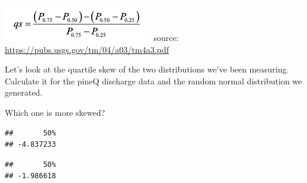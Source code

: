 \documentclass[
]{book}
\newenvironment{Shaded}{\begin{snugshade}}{\end{snugshade}}
\newcommand{\DecValTok}[1]{\textcolor[rgb]{0.00,0.00,0.81}{#1}}
\newcommand{\FunctionTok}[1]{\textcolor[rgb]{0.00,0.00,0.00}{#1}}
\newcommand{\NormalTok}[1]{#1}
\newcommand{\OtherTok}[1]{\textcolor[rgb]{0.56,0.35,0.01}{#1}}
\newcommand{\SpecialCharTok}[1]{\textcolor[rgb]{0.00,0.00,0.00}{#1}}
\begin{document}
\includegraphics{images/Screen Shot 2021-01-25 at 11.27.14 AM.png} source: \url{https://pubs.usgs.gov/tm/04/a03/tm4a3.pdf}

Let's look at the quartile skew of the two distributions we've been measuring. Calculate it for the pineQ discharge data and the random normal distribution we generated.

Which one is more skewed?

\begin{Shaded}
\end{Shaded}

\begin{verbatim}
##       50% 
## -4.837233
\end{verbatim}

\begin{Shaded}
\end{Shaded}

\begin{verbatim}
##       50% 
## -1.986618
\end{verbatim}
\end{document}
